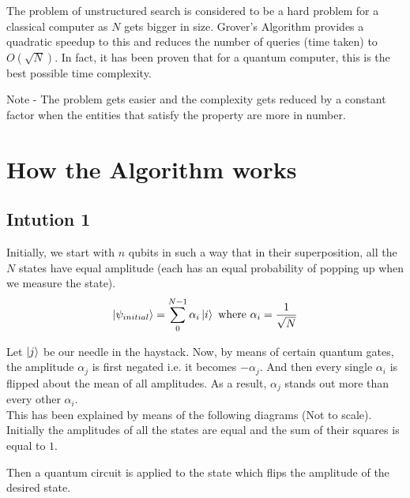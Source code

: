 \documentclass[a4paper]{article}
\begin{document}
The problem of unstructured search is considered to be a hard problem for a classical computer as $N$ gets bigger in size. Grover's Algorithm provides a quadratic speedup to this and reduces the number of queries (time taken) to $O(\sqrt{N})$. In fact, it has been proven that for a quantum computer, this is the best possible time complexity.

Note - The problem gets easier and the complexity gets reduced by a constant factor when the entities that satisfy the property are more in number.

\section{How the Algorithm works}
\subsection{Intution 1}
Initially, we start with $n$ qubits in such a way that in their superposition, all the $N$ states have equal amplitude (each has an equal probability of popping up when we measure the state).
$$\ket{\psi_{initial}} = \sum_{0}^{N-1} {\alpha_i}\ket{i} \text{ where } \alpha_i = \frac{1} {\sqrt{N}}$$

Let $\ket{j}$ be our needle in the haystack.
Now, by means of certain quantum gates, the amplitude $\alpha_j$ is first negated i.e. it becomes $-\alpha_j$. And then every single $\alpha_i$ is flipped about the mean of all amplitudes. As a result, $\alpha_j$ stands out more than every other $\alpha_i$.
\\[3cm]
\indent This has been explained by means of the following diagrams (Not to scale).
Initially the amplitudes of all the states are equal and the sum of their squares is equal to $1$.


Then a quantum circuit is applied to the state which flips the amplitude of the desired state.

\end{document}
